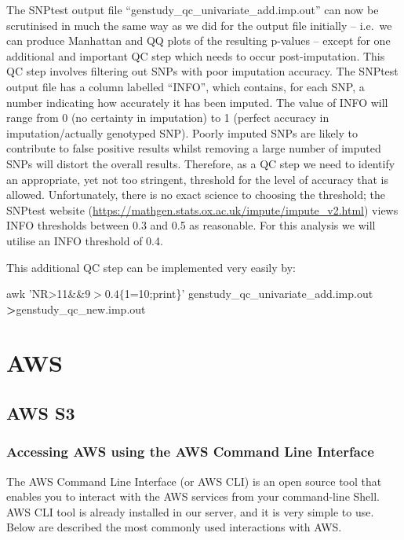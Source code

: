 \documentclass[]{book}
\newenvironment{Shaded}{\begin{snugshade}}{\end{snugshade}}
\newcommand{\StringTok}[1]{\textcolor[rgb]{0.31,0.60,0.02}{#1}}
\newcommand{\FunctionTok}[1]{\textcolor[rgb]{0.00,0.00,0.00}{#1}}
\newcommand{\OperatorTok}[1]{\textcolor[rgb]{0.81,0.36,0.00}{\textbf{#1}}}
\newcommand{\NormalTok}[1]{#1}
\begin{document}
The SNPtest output file ``genstudy\_qc\_univariate\_add.imp.out'' can
now be scrutinised in much the same way as we did for the output file
initially -- i.e.~we can produce Manhattan and QQ plots of the resulting
p-values -- except for one additional and important QC step which needs
to occur post-imputation. This QC step involves filtering out SNPs with
poor imputation accuracy. The SNPtest output file has a column labelled
``INFO'', which contains, for each SNP, a number indicating how
accurately it has been imputed. The value of INFO will range from 0 (no
certainty in imputation) to 1 (perfect accuracy in imputation/actually
genotyped SNP). Poorly imputed SNPs are likely to contribute to false
positive results whilst removing a large number of imputed SNPs will
distort the overall results. Therefore, as a QC step we need to identify
an appropriate, yet not too stringent, threshold for the level of
accuracy that is allowed. Unfortunately, there is no exact science to
choosing the threshold; the SNPtest website
(\url{https://mathgen.stats.ox.ac.uk/impute/impute_v2.html}) views INFO
thresholds between 0.3 and 0.5 as reasonable. For this analysis we will
utilise an INFO threshold of 0.4.

This additional QC step can be implemented very easily by:

\begin{Shaded}
\begin{Highlighting}[]
\FunctionTok{awk} \StringTok{'NR>11&&$9>0.4\{$1=10;print\}'}\NormalTok{ genstudy_qc_univariate_add.imp.out }\OperatorTok{>}\NormalTok{genstudy_qc_new.imp.out}
\end{Highlighting}
\end{Shaded}

\chapter{AWS}\label{aws}

\section{AWS S3}\label{aws-s3}

\subsection{Accessing AWS using the AWS Command Line
Interface}\label{accessing-aws-using-the-aws-command-line-interface}

The AWS Command Line Interface (or AWS CLI) is an open source tool that
enables you to interact with the AWS services from your command-line
Shell. AWS CLI tool is already installed in our server, and it is very
simple to use. Below are described the most commonly used interactions
with AWS.
\end{document}
